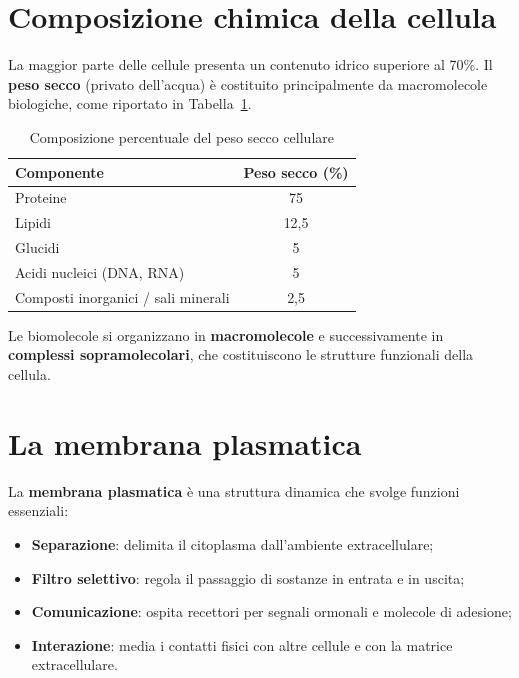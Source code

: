 \documentclass[12pt,a4paper]{report}
\begin{document}
\section{Composizione chimica della cellula}
La maggior parte delle cellule presenta un contenuto idrico superiore al 70\%. Il \textbf{peso secco} (privato dell'acqua) è costituito principalmente da macromolecole biologiche, come riportato in Tabella~\ref{tab:composizione-cellula}.
\begin{table}[htbp]
\centering
\caption{Composizione percentuale del peso secco cellulare}
\label{tab:composizione-cellula}
\renewcommand{\arraystretch}{1.2}
\begin{tabular}{@{} l c @{}}
\toprule
\textbf{Componente} & \textbf{Peso secco (\%)} \\
\midrule
Proteine & 75 \\
Lipidi & 12,5 \\
Glucidi & 5 \\
Acidi nucleici (DNA, RNA) & 5 \\
Composti inorganici / sali minerali & 2,5 \\
\bottomrule
\end{tabular}
\end{table}
Le biomolecole si organizzano in \textbf{macromolecole} e successivamente in \textbf{complessi sopramolecolari}, che costituiscono le strutture funzionali della cellula.

\section{La membrana plasmatica}
La \textbf{membrana plasmatica} è una struttura dinamica che svolge funzioni essenziali:
\begin{itemize}
\item \textbf{Separazione}: delimita il citoplasma dall'ambiente extracellulare;
\item \textbf{Filtro selettivo}: regola il passaggio di sostanze in entrata e in uscita;
\item \textbf{Comunicazione}: ospita recettori per segnali ormonali e molecole di adesione;
\item \textbf{Interazione}: media i contatti fisici con altre cellule e con la matrice extracellulare.
\end{itemize}
\end{document}
